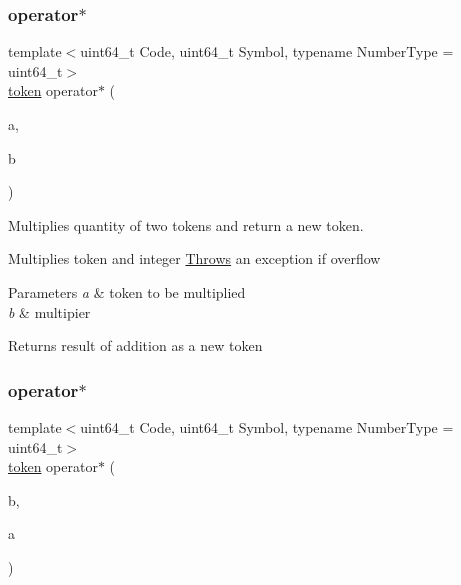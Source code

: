 \subsubsection{\texorpdfstring{operator$\ast$}{operator*}\hspace{0.1cm}{\footnotesize\ttfamily [1/2]}}
{\footnotesize\ttfamily template$<$uint64\+\_\+t Code, uint64\+\_\+t Symbol, typename Number\+Type  = uint64\+\_\+t$>$ \\
\mbox{\hyperlink{classaacio_1_1token}{token}} operator$\ast$ (\begin{DoxyParamCaption}\item[{const \mbox{\hyperlink{classaacio_1_1token}{token}}$<$ Code, Symbol, Number\+Type $>$ \&}]{a,  }\item[{uint64\+\_\+t}]{b }\end{DoxyParamCaption})\hspace{0.3cm}{\ttfamily [friend]}}



Multiplies quantity of two tokens and return a new token. 

Multiplies token and integer \mbox{\hyperlink{struct_throws}{Throws}} an exception if overflow 
\begin{DoxyParams}{Parameters}
{\em a} & token to be multiplied \\
\hline
{\em b} & multipier \\
\hline
\end{DoxyParams}
\begin{DoxyReturn}{Returns}
result of addition as a new token 
\end{DoxyReturn}
\mbox{\label{classaacio_1_1token_a253f895f9329454843e808216b8b350e}} 
\subsubsection{\texorpdfstring{operator$\ast$}{operator*}\hspace{0.1cm}{\footnotesize\ttfamily [2/2]}}
{\footnotesize\ttfamily template$<$uint64\+\_\+t Code, uint64\+\_\+t Symbol, typename Number\+Type  = uint64\+\_\+t$>$ \\
\mbox{\hyperlink{classaacio_1_1token}{token}} operator$\ast$ (\begin{DoxyParamCaption}\item[{uint64\+\_\+t}]{b,  }\item[{const \mbox{\hyperlink{classaacio_1_1token}{token}}$<$ Code, Symbol, Number\+Type $>$ \&}]{a }\end{DoxyParamCaption})\hspace{0.3cm}{\ttfamily [friend]}}



